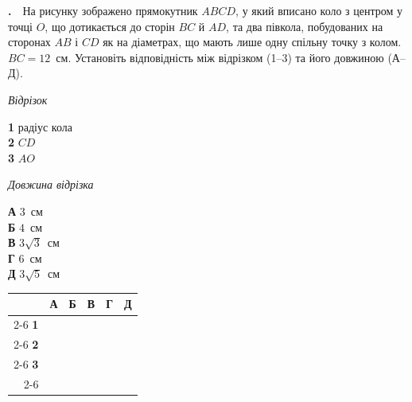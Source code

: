 \documentclass[12pt]{article}
\newcommand{\matchingGrid}{%
    \begingroup
    \renewcommand{\arraystretch}{1.15}
    \setlength{\tabcolsep}{4pt}
    \footnotesize
    \begin{tabular}{r|c|c|c|c|c|}
         \multicolumn{1}{c}{} & \multicolumn{1}{c}{\textbf{А}} & \multicolumn{1}{c}{\textbf{Б}} & \multicolumn{1}{c}{\textbf{В}} & \multicolumn{1}{c}{\textbf{Г}} & \multicolumn{1}{c}{\textbf{Д}} \\ \cline{2-6}
         \textbf{1} & \phantom{X} & \phantom{X} & \phantom{X} & \phantom{X} & \phantom{X} \\ \cline{2-6}
         \textbf{2} & & & & & \\ \cline{2-6}
         \textbf{3} & & & & & \\ \cline{2-6}
    \end{tabular}
    \endgroup
}
\newcounter{zad}
\newcommand{\zadtask}[1]{\stepcounter{zad}\par\vspace{0.3cm}\noindent\textbf{\thezad.}\ \ #1\par\vspace{0.2cm}}
\begin{document}
\zadtask{На рисунку зображено прямокутник $ABCD$, у який вписано коло з центром у точці $O$, що дотикається до сторін $BC$ й $AD$, та два півкола, побудованих на сторонах $AB$ і $CD$ як на діаметрах, що мають лише одну спільну точку з колом. $BC = 12$~см. Установіть відповідність між відрізком (1--3) та його довжиною (А--Д).}
\vspace{0.3cm}
\noindent
\begin{minipage}[c]{0.52\textwidth}
\begin{minipage}[t]{0.48\textwidth}
\textit{Відрізок}\par\vspace{0.15cm}
\textbf{1} \quad радіус кола\\[0.25cm]
\textbf{2} \quad $CD$\\[0.25cm]
\textbf{3} \quad $AO$
\end{minipage}
\hfill
\begin{minipage}[t]{0.48\textwidth}
\textit{Довжина відрізка}\par\vspace{0.15cm}
\textbf{А} \quad $3$~см\\[0.15cm]
\textbf{Б} \quad $4$~см\\[0.15cm]
\textbf{В} \quad $3\sqrt{3}$~см\\[0.15cm]
\textbf{Г} \quad $6$~см\\[0.15cm]
\textbf{Д} \quad $3\sqrt{5}$~см
\end{minipage}
\vspace{0.4cm}

\matchingGrid
\end{minipage}%
\hfill
\begin{minipage}[c]{0.45\textwidth}
\centering
{}
\end{minipage}
\newpage
\end{document}
